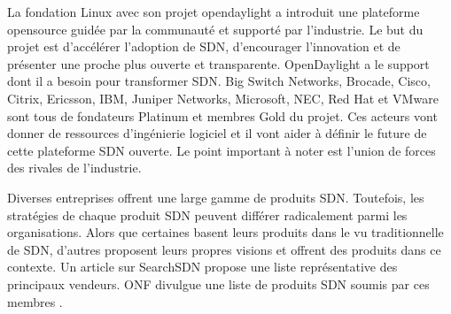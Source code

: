 La fondation Linux avec son projet \gls{opendaylight} a introduit une plateforme \gls{opensource} guidée par la communauté et supporté par l'industrie. Le but du projet est d'accélérer l'adoption de SDN, d'encourager l'innovation et de présenter une proche plus ouverte et transparente. OpenDaylight a le support dont il a besoin pour transformer SDN. Big Switch Networks, Brocade, Cisco, Citrix, Ericsson, IBM, Juniper Networks, Microsoft, NEC, Red Hat et VMware sont tous de fondateurs Platinum et membres Gold du projet. Ces acteurs vont donner de ressources d'ingénierie logiciel et il vont aider à définir le future de cette plateforme SDN ouverte. Le point important à noter est l'union de forces des rivales de l'industrie. \cite{ExecutiveGuideToSDNLinux}









Diverses entreprises offrent une large gamme de produits SDN. Toutefois, les stratégies de chaque produit SDN peuvent différer radicalement parmi les organisations. Alors que certaines basent leurs produits dans le vu traditionnelle de SDN, d'autres proposent leurs propres visions et offrent des produits dans ce contexte. Un article sur SearchSDN \cite{42Vendors} propose une liste représentative des principaux vendeurs. ONF divulgue une liste de produits SDN soumis par ces membres \cite{ProductDirectory}.  

